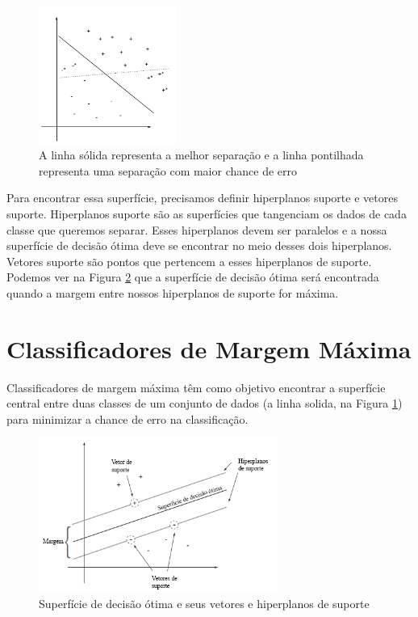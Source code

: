 \begin{figure}
  \centering
  \includegraphics[width=0.4\textwidth]{imagens/svm_2.png}
  \caption{A linha sólida representa a melhor separação e a linha pontilhada representa uma separação com maior chance de erro}
  \label{fig:LABEL_FIG_2}
\end{figure}

Para encontrar essa superfície, precisamos definir hiperplanos suporte e vetores suporte. Hiperplanos suporte são as superfícies que tangenciam os dados de cada classe que queremos separar. Esses hiperplanos devem ser paralelos e a nossa superfície de decisão ótima deve se encontrar no meio desses dois hiperplanos. Vetores suporte são pontos que pertencem a esses hiperplanos de suporte.
Podemos ver na Figura \ref{fig:LABEL_FIG_3} que a superfície de decisão ótima será encontrada quando a margem entre nossos hiperplanos de suporte for máxima.

\section{Classificadores de Margem Máxima}
Classificadores de margem máxima têm como objetivo encontrar a superfície central entre duas classes de um conjunto de dados (a linha solida, na Figura \ref{fig:LABEL_FIG_2}) para minimizar a chance de erro na classificação.

\begin{figure}
  \centering
  \includegraphics[width=0.7\textwidth]{imagens/svm_3.png}
  \caption{Superfície de decisão ótima e seus vetores e hiperplanos de suporte\cite{art:LIVRO_SVM}}
  \label{fig:LABEL_FIG_3}
\end{figure}

